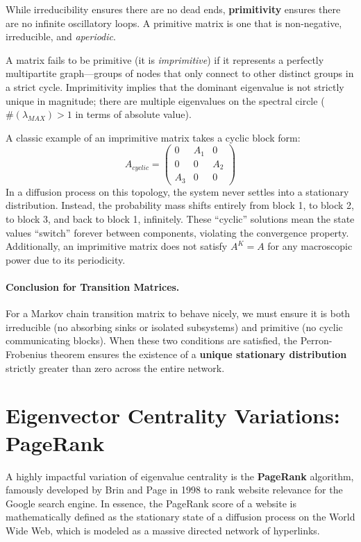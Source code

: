 While irreducibility ensures there are no dead ends, \textbf{primitivity} ensures there are no infinite oscillatory loops. A primitive matrix is one that is non-negative, irreducible, and \textit{aperiodic}.

A matrix fails to be primitive (it is \textit{imprimitive}) if it represents a perfectly multipartite graph—groups of nodes that only connect to other distinct groups in a strict cycle. Imprimitivity implies that the dominant eigenvalue is not strictly unique in magnitude; there are multiple eigenvalues on the spectral circle ($\#(\lambda_{MAX}) > 1$ in terms of absolute value).

A classic example of an imprimitive matrix takes a cyclic block form:
\[
    A_{cyclic} = \begin{pmatrix} 0 & A_1 & 0 \\ 0 & 0 & A_2 \\ A_3 & 0 & 0 \end{pmatrix}
\]
In a diffusion process on this topology, the system never settles into a stationary distribution. Instead, the probability mass shifts entirely from block 1, to block 2, to block 3, and back to block 1, infinitely. These ``cyclic'' solutions mean the state values ``switch'' forever between components, violating the convergence property. Additionally, an imprimitive matrix does not satisfy $A^K = A$ for any macroscopic power due to its periodicity.

\paragraph{Conclusion for Transition Matrices.}
For a Markov chain transition matrix to behave nicely, we must ensure it is both irreducible (no absorbing sinks or isolated subsystems) and primitive (no cyclic communicating blocks). When these two conditions are satisfied, the Perron-Frobenius theorem ensures the existence of a \textbf{unique stationary distribution} strictly greater than zero across the entire network.

\section{Eigenvector Centrality Variations: PageRank}

A highly impactful variation of eigenvalue centrality is the \textbf{PageRank} algorithm, famously developed by Brin and Page in 1998 to rank website relevance for the Google search engine. In essence, the PageRank score of a website is mathematically defined as the stationary state of a diffusion process on the World Wide Web, which is modeled as a massive directed network of hyperlinks.

